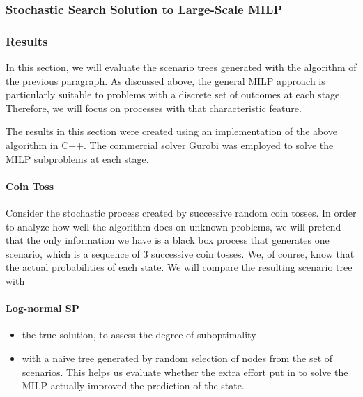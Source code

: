 \subsubsection{Stochastic Search Solution to Large-Scale MILP}

\subsubsection{Results}
In this section, we will evaluate the scenario trees generated with the algorithm of the previous paragraph. As discussed above, the general MILP approach is particularly suitable to problems with a discrete set of outcomes at each stage. Therefore, we will focus on processes with that characteristic feature.

The results in this section were created using an implementation of the above algorithm in C++. The commercial solver Gurobi was employed to solve the MILP subproblems at each stage.  

\paragraph{Coin Toss} Consider the stochastic process created by successive random coin tosses. In order to analyze how well the algorithm does on unknown problems, we will pretend that the only information we have is a black box process that generates one scenario, which is a sequence of 3 successive coin tosses. We, of course, know that the actual probabilities of each state. We will compare the resulting scenario tree with
\paragraph{Log-normal SP}
\begin{itemize}
\item the true solution, to assess the degree of suboptimality
\item with a naive tree generated by random selection of nodes from the set of scenarios. This helps us evaluate whether the extra effort put in to solve the MILP actually improved the prediction of the state.
\end{itemize}
